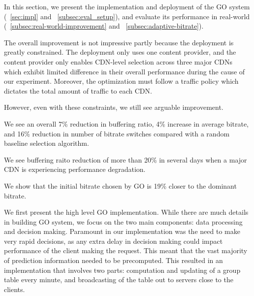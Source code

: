 \label{sec:eval}

In this section, we present the implementation and deployment of the GO system (\Section~\ref{sec:impl} and ~\ref{subsec:eval_setup}), and evaluate its performance in real-world (\Section~\ref{subsec:real-world-improvement} and ~\ref{subsec:adaptive-bitrate}). 

The overall improvement is not impressive partly because the deployment is greatly constrained. The deployment only uses one content provider, and the content provider only enables CDN-level selection across three major CDNs which exhibit limited difference in their overall performance during the cause of our experiment. Moreover, the optimization must follow a traffic policy which dictates the total amount of traffic to each CDN. 

However, even with these constraints, we still see arguable improvement. 

\begin{packedenumerate}
    \item We see an overall 7\% reduction in buffering ratio, 4\% increase in average bitrate, and 16\% reduction in number of bitrate switches compared with a random baseline selection algorithm.
    \item We see buffering raito reduction of more than 20\% in several days when a major CDN is experiencing performance degradation.
    \item We show that the initial bitrate chosen by GO is 19\% closer to the dominant bitrate.
\end{packedenumerate}

\label{sec:impl}
We first present the high level GO implementation. While there are much details in building GO system, we focus on the two main components: data processing and decision making. Paramount in our implementation was the need to make very rapid decisions, as any extra delay in decision making could impact performance of the client making the request. This meant that the vast majority of prediction information needed to be precomputed. This resulted in an implementation that involves two parts: computation and updating of a group table every minute, and broadcasting of the table out to servers close to the clients.

